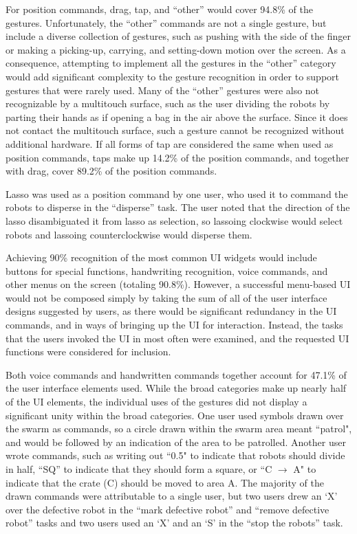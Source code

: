 For position commands, drag, tap, and ``other'' would cover 94.8\% of the gestures. 
Unfortunately, the ``other'' commands are not a single gesture, but include a diverse collection of gestures, such as pushing with the side of the finger or making a picking-up, carrying, and setting-down motion over the screen.
As a consequence, attempting to implement all the gestures in the ``other'' category would add significant complexity to the gesture recognition in order to support gestures that were rarely used. 
Many of the ``other'' gestures were also not recognizable by a multitouch surface, such as the user dividing the robots by parting their hands as if opening a bag in the air above the surface. 
Since it does not contact the multitouch surface, such a gesture cannot be recognized without additional hardware. 
If all forms of tap are considered the same when used as position commands, taps make up 14.2\% of the position commands, and together with drag, cover 89.2\% of the position commands. 

Lasso was used as a position command by one user, who used it to command the robots to disperse in the ``disperse'' task. 
The user noted that the direction of the lasso disambiguated it from lasso as selection, so lassoing clockwise would select robots and lassoing counterclockwise would disperse them. 

Achieving 90\% recognition of the most common UI widgets would include buttons for special functions, handwriting recognition, voice commands, and other menus on the screen (totaling 90.8\%). 
However, a successful menu-based UI would not be composed simply by taking the sum of all of the user interface designs suggested by users, as there would be significant redundancy in the UI commands, and in ways of bringing up the UI for interaction. 
Instead, the tasks that the users invoked the UI in most often were examined, and the requested UI functions were considered for inclusion.

Both voice commands and handwritten commands together account for 47.1\% of the user interface elements used.
While the broad categories make up nearly half of the UI elements, the individual uses of the gestures did not display a significant unity within the broad categories.
One user used symbols drawn over the swarm as commands, so a circle drawn within the swarm area meant ``patrol", and would be followed by an indication of the area to be patrolled. 
Another user wrote commands, such as writing out ``0.5" to indicate that robots should divide in half, ``SQ'' to indicate that they should form a square, or ``C $\rightarrow$ A" to indicate that the crate (C) should be moved to area A. 
The majority of the drawn commands were attributable to a single user, but two users drew an `X' over the defective robot in the ``mark defective robot'' and ``remove defective robot'' tasks and two users used an `X' and an `S' in the ``stop the robots'' task.

